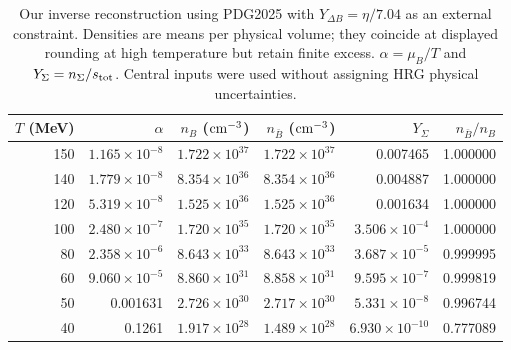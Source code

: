 \begin{table}[t]\centering\small
\caption{Our inverse reconstruction using PDG2025 with $Y_{\Delta B}=\eta/7.04$ as an external constraint. Densities are means per physical volume; they coincide at displayed rounding at high temperature but retain finite excess. $\alpha=\mu_B/T$ and $Y_\Sigma=n_\Sigma/s_{\rm tot}$. Central inputs were used without assigning HRG physical uncertainties.}\label{tab:inversepop}
\setlength{\tabcolsep}{7pt}\renewcommand{\arraystretch}{1.14}
\begin{tabular}{rrrrrr}\toprule
$T$ (MeV) & $\alpha$ & $n_B$ (${\rm cm^{-3}}$) & $n_{\bar B}$ (${\rm cm^{-3}}$) & $Y_\Sigma$ & $n_{\bar B}/n_B$ \\ \midrule
150 & $1.165\times10^{-8}$ & $1.722\times10^{37}$ & $1.722\times10^{37}$ & 0.007465 & 1.000000 \\
140 & $1.779\times10^{-8}$ & $8.354\times10^{36}$ & $8.354\times10^{36}$ & 0.004887 & 1.000000 \\
120 & $5.319\times10^{-8}$ & $1.525\times10^{36}$ & $1.525\times10^{36}$ & 0.001634 & 1.000000 \\
100 & $2.480\times10^{-7}$ & $1.720\times10^{35}$ & $1.720\times10^{35}$ & $3.506\times10^{-4}$ & 1.000000 \\
80 & $2.358\times10^{-6}$ & $8.643\times10^{33}$ & $8.643\times10^{33}$ & $3.687\times10^{-5}$ & 0.999995 \\
60 & $9.060\times10^{-5}$ & $8.860\times10^{31}$ & $8.858\times10^{31}$ & $9.595\times10^{-7}$ & 0.999819 \\
50 & 0.001631 & $2.726\times10^{30}$ & $2.717\times10^{30}$ & $5.331\times10^{-8}$ & 0.996744 \\
40 & 0.1261 & $1.917\times10^{28}$ & $1.489\times10^{28}$ & $6.930\times10^{-10}$ & 0.777089 \\
\bottomrule\end{tabular}\end{table}
